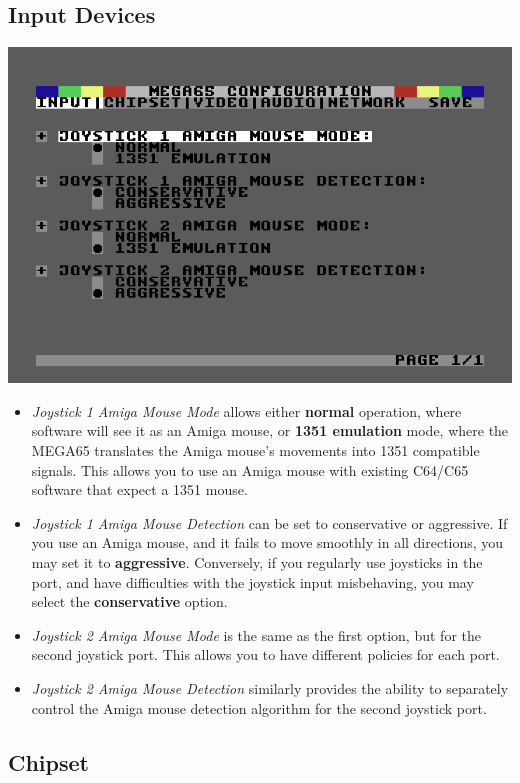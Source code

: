 \subsection{Input Devices}

\includegraphics[width=\linewidth]{images/ss-m65config-1.png}

\begin{itemize}
  \item{\em Joystick 1 Amiga Mouse Mode} allows either {\bf normal} operation,
    where software will see it as an Amiga mouse, or {\bf 1351
      emulation} mode, where the MEGA65 translates the Amiga mouse's
    movements into 1351 compatible signals. This allows you to use an
    Amiga mouse with existing C64/C65 software that expect a 1351
    mouse.
  \item{\em Joystick 1 Amiga Mouse Detection} can be set to conservative
    or aggressive.  If you use an Amiga mouse, and it fails to move
    smoothly in all directions, you may set it to {\bf
      aggressive}. Conversely, if you regularly use joysticks in the
    port, and have difficulties with the joystick input
    misbehaving, you may select the {\bf conservative}
    option.
  \item{\em Joystick 2 Amiga Mouse Mode} is the same as the first
    option, but for the second joystick port. This allows you to
    have different policies for each port.
  \item{\em Joystick 2 Amiga Mouse Detection} similarly provides the
    ability to separately control the Amiga mouse detection
    algorithm for the second joystick port.
\end{itemize}


\subsection{Chipset}

